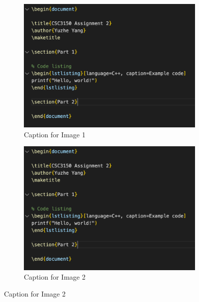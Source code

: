 \documentclass[12pt,a4paper]{report}
\begin{document}
\begin{figure}[h]
    \centering

    \begin{subfigure}{0.4\textwidth}
        \centering
        \includegraphics[width=\textwidth]{src/example.png}
        \caption{Caption for Image 1}
    \end{subfigure}
    \hfill
    \begin{subfigure}{0.4\textwidth}
        \centering
        \includegraphics[width=\textwidth]{src/example.png}
        \caption{Caption for Image 2}
    \end{subfigure}

    \vspace{0.5cm} %


\end{figure}
\end{document}
